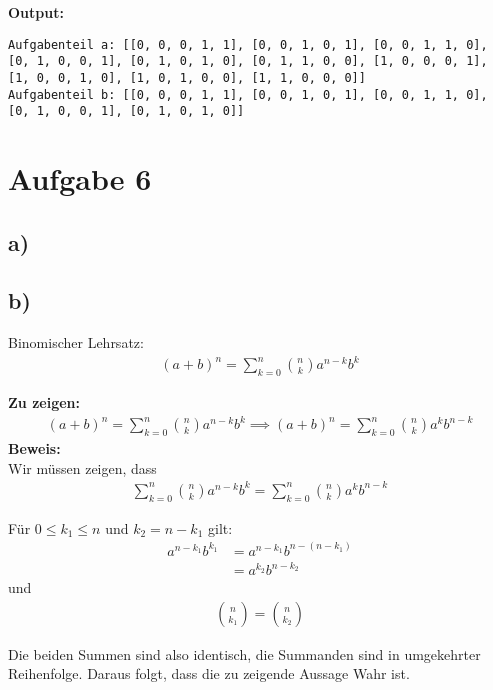 \documentclass[a4paper]{scrartcl}
\begin{document}
\textbf{Output:}
\begin{lstlisting}
Aufgabenteil a: [[0, 0, 0, 1, 1], [0, 0, 1, 0, 1], [0, 0, 1, 1, 0], 
[0, 1, 0, 0, 1], [0, 1, 0, 1, 0], [0, 1, 1, 0, 0], [1, 0, 0, 0, 1], 
[1, 0, 0, 1, 0], [1, 0, 1, 0, 0], [1, 1, 0, 0, 0]]
Aufgabenteil b: [[0, 0, 0, 1, 1], [0, 0, 1, 0, 1], [0, 0, 1, 1, 0], 
[0, 1, 0, 0, 1], [0, 1, 0, 1, 0]]
\end{lstlisting}

\section*{Aufgabe 6}
\subsection*{a)}

\subsection*{b)}
Binomischer Lehrsatz:
\begin{align*}
    (a + b)^n = \sum_{k=0}^{n} \binom{n}{k} a^{n-k} b^k
\end{align*}

\textbf{Zu zeigen:}
\begin{align*}
    (a + b)^n = \sum_{k=0}^{n} \binom{n}{k} a^{n-k} b^k \implies (a + b)^n = \sum_{k=0}^{n} \binom{n}{k} a^{k} b^{n-k}
\end{align*}
\textbf{Beweis:} \\
Wir müssen zeigen, dass
\begin{align*}
    \sum_{k=0}^{n} \binom{n}{k} a^{n-k} b^k = \sum_{k=0}^{n} \binom{n}{k} a^k b^{n-k}
\end{align*}

Für $0 \le k_1 \le n$ und $k_2 = n - k_1$ gilt:
\begin{align}
    a^{n-k_1} b^{k_1} &= a^{n - k_1} b^{n - (n - k_1)} \\
    &= a^{k_2} b^{n-k_2} 
\end{align}
und 
\begin{align*}
    \binom{n}{k_1} = \binom{n}{k_2}
\end{align*}

Die beiden Summen sind also identisch, die Summanden sind in umgekehrter Reihenfolge. 
Daraus folgt, dass die zu zeigende Aussage Wahr ist.
\end{document}
